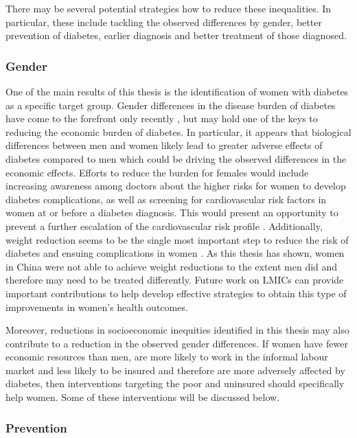 There may be several potential strategies how to reduce these inequalities. In particular, these include tackling the observed differences by gender, better prevention of diabetes, earlier diagnosis and better treatment of those diagnosed.

\subsubsection{Gender}

One of the main results of this thesis is the identification of women with diabetes as a specific target group. Gender differences in the disease burden of diabetes have come to the forefront only recently \parencite{Peters2015}, but may hold one of the keys to reducing the economic burden of diabetes. In particular, it appears that biological differences between men and women likely lead to greater adverse effects of diabetes compared to men \parencite{Peters2015,Peters2014a,Peters2014,Bertram2010} which could be driving the observed differences in the economic effects. Efforts to reduce the burden for females would include increasing awareness among doctors about the higher risks for women to develop diabetes complications, as well as screening for cardiovascular risk factors in women at or before a diabetes diagnosis. This would present an opportunity to prevent a further escalation of the cardiovascular risk profile \parencite{Peters2015}. Additionally, weight reduction seems to be the single most important step to reduce the risk of diabetes and ensuing complications in women \parencite{Peters2015}. As this thesis has shown, women in China were not able to achieve weight reductions to the extent men did and therefore may need to be treated differently. Future work on \acp{LMIC} can provide important contributions to help develop effective strategies to obtain this type of improvements in women's health outcomes.

Moreover, reductions in socioeconomic inequities identified in this thesis may also contribute to a reduction in the observed gender differences. If women have fewer economic resources than men, are more likely to work in the informal labour market and less likely to be insured \parencite{Galli2008} and therefore are more adversely affected by diabetes, then interventions targeting the poor and uninsured should specifically help women. Some of these interventions will be discussed below.

\subsubsection{Prevention}

